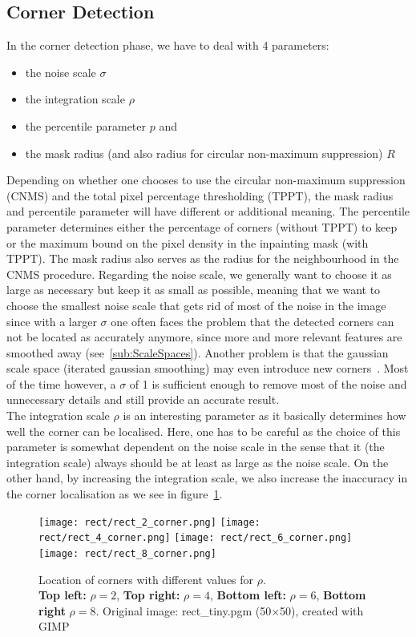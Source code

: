 \subsection{Corner Detection}\label{sec:CornerEx}
In the corner detection phase, we have to deal with 4 parameters:
\begin{itemize}
    \item the noise scale $\sigma$
    \item the integration scale $\rho$
    \item the percentile parameter $p$ and
    \item the mask radius (and also radius for circular non-maximum suppression) $R$
\end{itemize}
Depending on whether one chooses to use the circular non-maximum suppression (CNMS) and the total pixel
percentage thresholding (TPPT), the mask radius and percentile parameter will have different or additional
meaning.
The percentile parameter determines either the percentage of corners (without TPPT) to keep or the maximum bound
on the pixel density in the inpainting mask (with TPPT).
The mask radius also serves as the radius for the neighbourhood in the CNMS procedure.
\newpage\noindent
Regarding the noise scale, we generally want to choose it as large as necessary but keep it as small as
possible, meaning that we want to choose the smallest noise scale that gets rid of most of the
noise in the image since with a larger $\sigma$ 
one often faces the problem that the detected corners can not be located as accurately anymore,
since more and more relevant features are smoothed away (see~\ref{sub:ScaleSpaces}). Another problem
is that the gaussian scale space (iterated gaussian smoothing) may even introduce new
corners~\cite{weickert96}.
 Most of the time however, a $\sigma$ of 1 is sufficient enough to remove most of the noise and unnecessary
 details and still provide an accurate result.\\
 The integration scale $\rho$ is an interesting parameter as it basically determines how well the
 corner can be localised. Here, one has to be careful as the choice of this parameter is somewhat
 dependent on the noise scale in the sense that it (the integration scale) always should be 
 at least as large as the noise scale. On the other hand, by increasing the integration scale, we
 also increase the inaccuracy in the corner localisation as we see in
 figure~\ref{fig:Integration}.
\begin{figure}[h]
    \centering
    \texttt{[image: rect/rect\_2\_corner.png]}
    \texttt{[image: rect/rect\_4\_corner.png]}
    \texttt{[image: rect/rect\_6\_corner.png]}
    \texttt{[image: rect/rect\_8\_corner.png]}
    \caption{Location of corners with different values for $\rho$.\\
\textbf{Top left:} $\rho=2$, \textbf{Top right:} $\rho=4$, \textbf{Bottom left:}
$\rho=6$, \textbf{Bottom right} $\rho=8$. Original image: rect\_tiny.pgm (50$\times$50), created with
GIMP~\cite{gimp}}\label{fig:Integration}
\end{figure}
